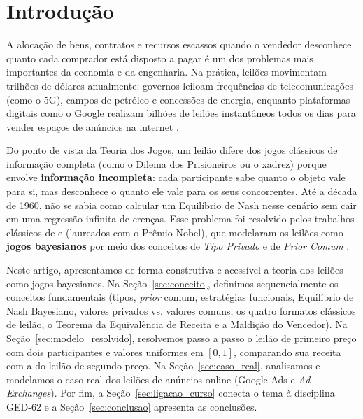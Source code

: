 \section{Introdução}
\label{sec:introducao}

A alocação de bens, contratos e recursos escassos quando o vendedor desconhece quanto cada comprador está disposto a pagar é um dos problemas mais importantes da economia e da engenharia. Na prática, leilões movimentam trilhões de dólares anualmente: governos leiloam frequências de telecomunicações (como o 5G), campos de petróleo e concessões de energia, enquanto plataformas digitais como o Google realizam bilhões de leilões instantâneos todos os dias para vender espaços de anúncios na internet \cite{klemperer2004,edelman2007,despotakis2021}.

Do ponto de vista da Teoria dos Jogos, um leilão difere dos jogos clássicos de informação completa (como o Dilema dos Prisioneiros ou o xadrez) porque envolve \textbf{informação incompleta}: cada participante sabe quanto o objeto vale para si, mas desconhece o quanto ele vale para os seus concorrentes. Até a década de 1960, não se sabia como calcular um Equilíbrio de Nash nesse cenário sem cair em uma regressão infinita de crenças. Esse problema foi resolvido pelos trabalhos clássicos de \cite{vickrey1961} e \cite{harsanyi1967} (laureados com o Prêmio Nobel), que modelaram os leilões como \textbf{jogos bayesianos} por meio dos conceitos de \textit{Tipo Privado} e de \textit{Prior Comum} \cite{gibbons1992}.

Neste artigo, apresentamos de forma construtiva e acessível a teoria dos leilões como jogos bayesianos. Na Seção~\ref{sec:conceito}, definimos sequencialmente os conceitos fundamentais (tipos, \textit{prior} comum, estratégias funcionais, Equilíbrio de Nash Bayesiano, valores privados vs. valores comuns, os quatro formatos clássicos de leilão, o Teorema da Equivalência de Receita e a Maldição do Vencedor). Na Seção~\ref{sec:modelo_resolvido}, resolvemos passo a passo o leilão de primeiro preço com dois participantes e valores uniformes em $[0,1]$, comparando sua receita com a do leilão de segundo preço. Na Seção~\ref{sec:caso_real}, analisamos e modelamos o caso real dos leilões de anúncios online (Google Ads e \textit{Ad Exchanges}). Por fim, a Seção~\ref{sec:ligacao_curso} conecta o tema à disciplina GED-62 e a Seção~\ref{sec:conclusao} apresenta as conclusões.
